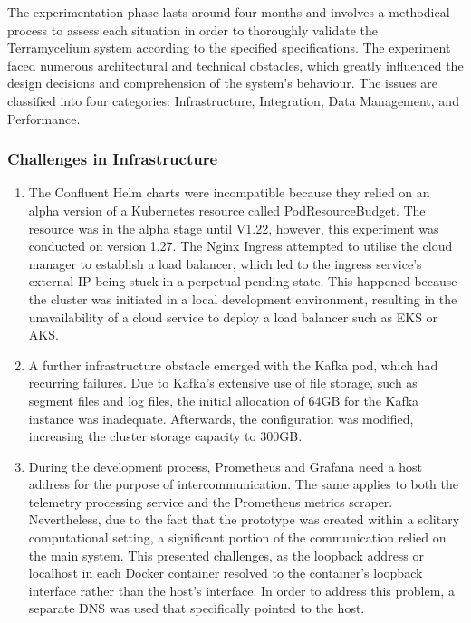 \documentclass[review]{elsarticle}
\begin{document}
The experimentation phase lasts around four months and involves a methodical process to assess each situation in order to thoroughly validate the Terramycelium system according to the specified specifications. The experiment faced numerous architectural and technical obstacles, which greatly influenced the design decisions and comprehension of the system's behaviour. The issues are classified into four categories: Infrastructure, Integration, Data Management, and Performance.

\subsubsection{Challenges in Infrastructure} 

\begin{enumerate}[label=({\alph*}) , leftmargin=30px]

    \item The Confluent Helm charts were incompatible because they relied on an alpha version of a Kubernetes resource called PodResourceBudget. The resource was in the alpha stage until V1.22, however, this experiment was conducted on version 1.27. The Nginx Ingress attempted to utilise the cloud manager to establish a load balancer, which led to the ingress service's external IP being stuck in a perpetual pending state. This happened because the cluster was initiated in a local development environment, resulting in the unavailability of a cloud service to deploy a load balancer such as EKS or AKS.

    \item A further infrastructure obstacle emerged with the Kafka pod, which had recurring failures. Due to Kafka's extensive use of file storage, such as segment files and log files, the initial allocation of 64GB for the Kafka instance was inadequate. Afterwards, the configuration was modified, increasing the cluster storage capacity to 300GB.

    \item During the development process, Prometheus and Grafana need a host address for the purpose of intercommunication. The same applies to both the telemetry processing service and the Prometheus metrics scraper. Nevertheless, due to the fact that the prototype was created within a solitary computational setting, a significant portion of the communication relied on the main system. This presented challenges, as the loopback address or localhost in each Docker container resolved to the container's loopback interface rather than the host's interface. In order to address this problem, a separate DNS was used that specifically pointed to the host.

\end{enumerate} 
\end{document}
